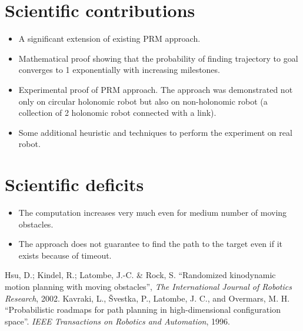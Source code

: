 \documentclass[12pt]{article}
\begin{document}
\section{Scientific contributions}
\begin{itemize}
    \item A significant extension of existing PRM approach.
    \item Mathematical proof showing that the probability of finding trajectory to goal converges to 1 exponentially with increasing milestones.
    \item Experimental proof of PRM approach. The approach was demonstrated not only on circular holonomic robot but also on non-holonomic robot (a collection of 2 holonomic robot connected with a link).
    \item Some additional heuristic and techniques to perform the experiment on real robot.
\end{itemize}

\section{Scientific deficits}
\begin{itemize}
    \item The computation increases very much even for medium number of moving obstacles.
    \item The approach does not guarantee to find the path to the target even if it exists because of timeout.
\end{itemize}

\begin{thebibliography}{1}
     Hsu, D.; Kindel, R.; Latombe, J.-C. \& Rock, S. ``Randomized kinodynamic motion planning with moving obstacles'', \textit{The International Journal of Robotics Research}, 2002.
     Kavraki, L., Švestka, P., Latombe, J. C., and Overmars, M. H. ``Probabilistic roadmaps for path planning in high-dimensional configuration space''. \textit{IEEE Transactions on Robotics and Automation}, 1996.
\end{thebibliography}
\end{document}

